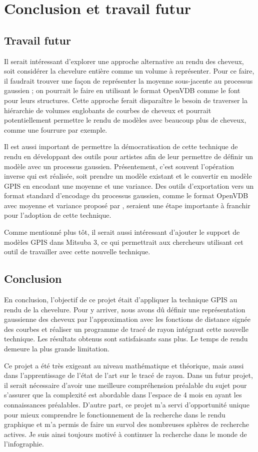 \section{Conclusion et travail futur}

\subsection{Travail futur}

Il serait intéressant d'explorer une approche alternative au rendu des cheveux, soit considérer la chevelure entière comme un volume à représenter. Pour ce faire, il faudrait trouver une façon de représenter la moyenne sous-jacente au processus gaussien ; on pourrait le faire en utilisant le format OpenVDB comme le font \textcite{seyb24from} pour leurs structures. Cette approche ferait disparaître le besoin de traverser la hiérarchie de volumes englobants de courbes de cheveux et pourrait potentiellement permettre le rendu de modèles avec beaucoup plus de cheveux, comme une fourrure par exemple.

Il est aussi important de permettre la démocratisation de cette technique de rendu en développant des outils pour artistes afin de leur permettre de définir un modèle avec un processus gaussien. Présentement, c'est souvent l'opération inverse qui est réalisée, soit prendre un modèle existant et le convertir en modèle GPIS en encodant une moyenne et une variance. Des outils d'exportation vers un format standard d'encodage du processus gaussien, comme le format OpenVDB avec moyenne et variance proposé par \textcite{seyb24from}, seraient une étape importante à franchir pour l'adoption de cette technique.

Comme mentionné plus tôt, il serait aussi intéressant d'ajouter le support de modèles GPIS dans Mitsuba 3, ce qui permettrait aux chercheurs utilisant cet outil de travailler avec cette nouvelle technique.

\subsection{Conclusion}

En conclusion, l'objectif de ce projet était d'appliquer la technique GPIS au rendu de la chevelure. Pour y arriver, nous avons dû définir une représentation gaussienne des cheveux par l'approximation avec les fonctions de distance signée des courbes et réaliser un programme de tracé de rayon intégrant cette nouvelle technique. Les résultats obtenus sont satisfaisants sans plus. Le temps de rendu demeure la plus grande limitation.

Ce projet a été très exigeant au niveau mathématique et théorique, mais aussi dans l'apprentissage de l'état de l'art sur le tracé de rayon. Dans un futur projet, il serait nécessaire d'avoir une meilleure compréhension préalable du sujet pour s'assurer que la complexité est abordable dans l'espace de 4 mois en ayant les connaissances préalables. D'autre part, ce projet m'a servi d'opportunité unique pour mieux comprendre le fonctionnement de la recherche dans le rendu graphique et m'a permis de faire un survol des nombreuses sphères de recherche actives. Je suis ainsi toujours motivé à continuer la recherche dans le monde de l'infographie.
